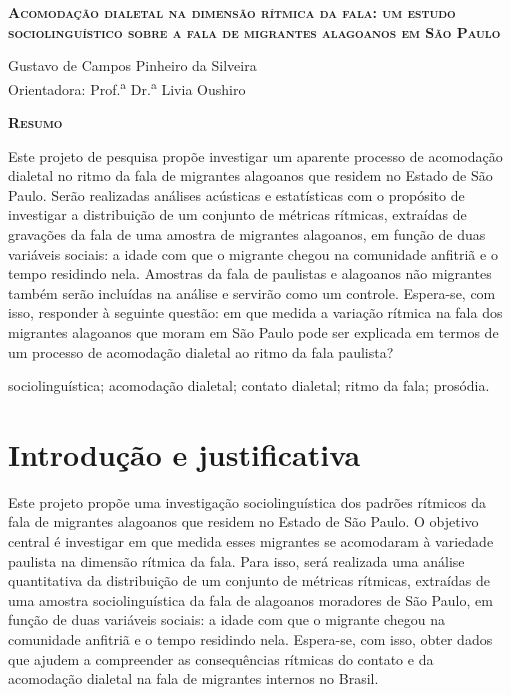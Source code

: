 \documentclass[
		a4paper,	%
		12pt,		%
		]{article}	%
\begin{document}
		
	{ %
		\begin{center} {\bfseries\Large\scshape Acomodação dialetal na dimensão
				rítmica da fala: um estudo sociolinguístico sobre a fala de
				migrantes alagoanos em São Paulo } \end{center} }
		
	\vspace{0.35em}

	{ %

		\begin{flushright} 
			Gustavo de Campos Pinheiro da Silveira \\ 
			\vspace{5pt}
			Orientadora: Prof.\textsuperscript{a} Dr.\textsuperscript{a} Livia Oushiro
		\end{flushright}

		\begin{center} 
			{\bfseries\scshape Resumo} \\ 
		\end{center}
			Este projeto de pesquisa propõe investigar um aparente processo de
			acomodação dialetal no ritmo da fala de migrantes alagoanos que
			residem no Estado de São Paulo. Serão realizadas análises acústicas
			e estatísticas com o propósito de investigar a distribuição de um
			conjunto de métricas rítmicas, extraídas de gravações da fala de uma
			amostra de migrantes alagoanos, em função de duas variáveis sociais:
			a idade com que o migrante chegou na comunidade anfitriã e o tempo
			residindo nela. Amostras da fala de paulistas e alagoanos não
			migrantes também serão incluídas na análise e servirão como um
			controle. Espera-se, com isso, responder à seguinte questão: em que
			medida a variação rítmica na fala dos migrantes alagoanos que moram
			em São Paulo pode ser explicada em termos de um processo de
			acomodação dialetal ao ritmo da fala paulista?
		\par
		\vspace{1.35em}
		 sociolinguística; acomodação dialetal;
			contato dialetal; ritmo da fala; prosódia.
			
	}

	\section{Introdução e justificativa} 
	\label{intro}

	Este projeto propõe uma investigação sociolinguística dos padrões rítmicos
	da fala de migrantes alagoanos que residem no Estado de São Paulo. O
	objetivo central é investigar em que medida esses migrantes se acomodaram à
	variedade paulista na dimensão rítmica da fala. Para isso, será realizada
	uma análise quantitativa da distribuição de um conjunto de métricas
	rítmicas, extraídas de uma amostra sociolinguística da fala de alagoanos
	moradores de São Paulo, em função de duas variáveis sociais: a idade com que
	o migrante chegou na comunidade anfitriã e o tempo residindo nela.
	Espera-se, com isso, obter dados que ajudem a compreender as consequências
	rítmicas do contato e da acomodação dialetal na fala de migrantes internos
	no Brasil.
	
\end{document}
